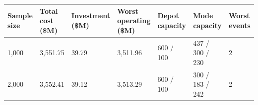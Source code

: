 \begin{tabular}{lllllll}
\toprule
Sample size & Total cost (\$M) & Investment (\$M) & Worst operating (\$M) & Depot capacity & Mode capacity & Worst events \\
\midrule
1,000 & 3,551.75 & 39.79 & 3,511.96 & 600 / 100 & 437 / 300 / 230 & 2 \\
2,000 & 3,552.41 & 39.12 & 3,513.29 & 600 / 100 & 300 / 183 / 242 & 2 \\
\bottomrule
\end{tabular}
